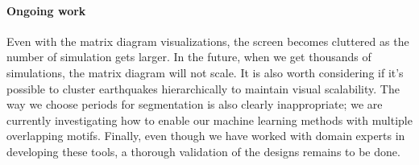 \paragraph*{Ongoing work}
\label{sec:conclusion}


Even with the matrix diagram visualizations, the screen becomes cluttered as the number of simulation gets larger. In the future, when we get thousands of simulations, the matrix diagram will not scale. It is also worth considering if it's possible to cluster earthquakes hierarchically to maintain visual scalability. The way we choose periods for segmentation is also clearly inappropriate; we are currently investigating how to enable our machine learning methods with multiple overlapping motifs.
Finally, even though we have worked with domain experts in developing these tools, a thorough validation of the designs remains to be done.
